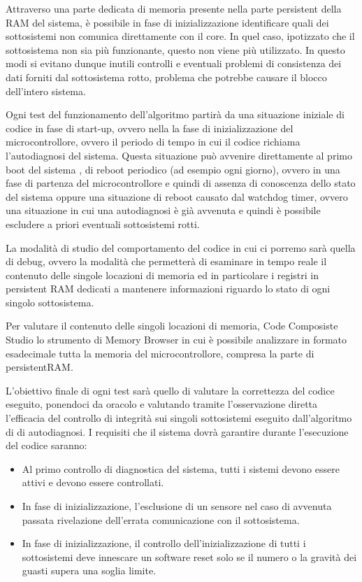 \documentclass[LaM,binding=0.6cm]{../sapthesis}
\begin{document}
Attraverso una parte dedicata di memoria presente nella parte persistent della RAM del sistema, è possibile in fase di inizializzazione identificare quali dei sottosistemi non comunica direttamente con il core. In quel caso, ipotizzato che il sottosistema non sia più funzionante, questo non viene più utilizzato. In questo modi si evitano dunque inutili controlli e eventuali problemi di consistenza dei dati forniti dal sottosistema rotto, problema che potrebbe causare il blocco dell'intero sistema.

Ogni test del funzionamento dell'algoritmo partirà da una situazione iniziale di codice in fase di start-up, ovvero nella la fase di inizializzazione del microcontrollore, ovvero il periodo di tempo in cui il codice richiama l'autodiagnosi del sistema. Questa situazione può avvenire direttamente al primo boot del sistema , di reboot periodico (ad esempio ogni giorno), ovvero in una fase di partenza del microcontrollore e quindi di assenza di conoscenza dello stato del sistema oppure una situazione di reboot causato dal watchdog timer, ovvero una situazione in cui una autodiagnosi è già avvenuta e quindi è possibile escludere a priori eventuali sottosistemi rotti.

La modalità di studio del comportamento del codice in cui ci porremo sarà quella di debug, ovvero la modalità che permetterà di esaminare in tempo reale il contenuto delle singole locazioni di memoria ed in particolare i registri in persistent RAM dedicati a mantenere informazioni riguardo lo stato di ogni singolo sottosistema.

Per valutare il contenuto delle singoli locazioni di memoria, Code Composiste Studio lo strumento di Memory Browser in cui è possibile analizzare in formato esadecimale tutta la memoria del microcontrollore, compresa la parte di persistentRAM.

L'obiettivo finale di ogni test sarà quello di valutare la correttezza del codice eseguito, ponendoci da oracolo e valutando tramite l'osservazione diretta l'efficacia del controllo di integrità sui singoli sottosistemi eseguito dall'algoritmo di di autodiagnosi.\newline\newline
I requisiti che il sistema dovrà garantire durante l'esecuzione del codice saranno:
\begin{itemize}

    \item Al primo controllo di diagnostica del sistema, tutti i sistemi devono essere attivi e devono essere controllati.
    
    \item  In fase di inizializzazione, l'esclusione di un sensore nel caso di avvenuta passata rivelazione dell'errata comunicazione con il sottosistema.
    
    \item In fase di inizializzazione, il controllo dell'inizializzazione di tutti i sottosistemi deve innescare un software reset solo se il numero o la gravità dei guasti supera una soglia limite.
    
\end{itemize}
\end{document}
